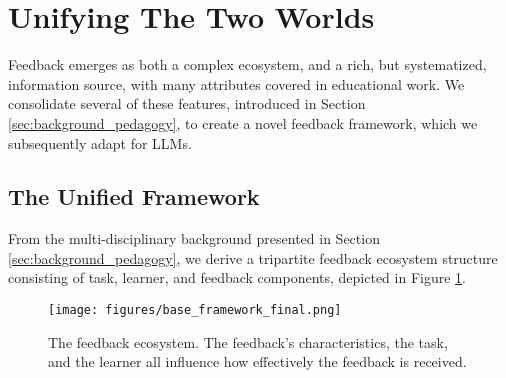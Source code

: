 \section{Unifying The Two Worlds}
\label{sec:framework}

Feedback emerges as both a complex ecosystem, and a rich, but systematized, information source, with many attributes covered in educational work. We consolidate several of these features, introduced in Section \ref{sec:background_pedagogy}, to create a novel feedback framework, which we subsequently adapt for LLMs.


\subsection{The Unified Framework}


From the multi-disciplinary background presented in Section \ref{sec:background_pedagogy}, we derive a tripartite feedback ecosystem structure consisting of task, learner, and feedback components, depicted in Figure \ref{fig:base_framework}.

\begin{figure}[ht]
\centering
\texttt{[image: figures/base\_framework\_final.png]}
\caption{The feedback ecosystem. The feedback's characteristics, the task, and the learner all influence how effectively the feedback is received.}
\label{fig:base_framework}
\end{figure}

